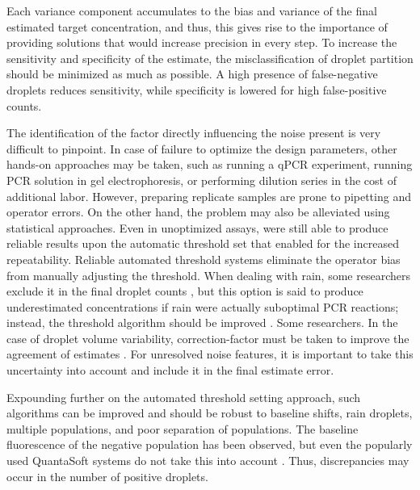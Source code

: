 Each variance component accumulates to the bias and variance of the final estimated target concentration, and thus, this gives rise to the importance of providing solutions that would increase precision in every step. To increase the sensitivity and specificity of the estimate, the misclassification of droplet partition should be minimized as much as possible. A high presence of false-negative droplets reduces sensitivity, while specificity is lowered for high false-positive counts. 

The identification of the factor directly influencing the noise present is very difficult to pinpoint. In case of failure to optimize the design parameters, other hands-on approaches may be taken, such as running a qPCR experiment, running PCR solution in gel electrophoresis, or performing dilution series in the cost of additional labor. However, preparing replicate samples are prone to pipetting and operator errors. On the other hand, the problem may also be alleviated using statistical approaches. Even in unoptimized assays,  were still able to produce reliable results upon the automatic threshold set that enabled for the increased repeatability. Reliable automated threshold systems eliminate the operator bias from manually adjusting the threshold. When dealing with rain, some researchers exclude it in the final droplet counts \cite{Jones2014}, but this option is said to produce underestimated concentrations if rain were actually suboptimal PCR reactions; instead, the threshold algorithm should be improved \cite{Trypsteen2015}. Some researchers. In the case of droplet volume variability, correction-factor must be taken to improve the agreement of estimates  \cite{Demeke2018}.  For unresolved noise features, it is important to take this uncertainty into account and include it in the final estimate error.

Expounding further on the automated threshold setting approach, such algorithms can be improved and should be robust to baseline shifts, rain droplets, multiple populations, and poor separation of populations. The baseline fluorescence of the negative population has been observed, but even the popularly used QuantaSoft systems do not take this into account \cite{Trypsteen2015}. Thus, discrepancies may occur in the number of positive droplets.

